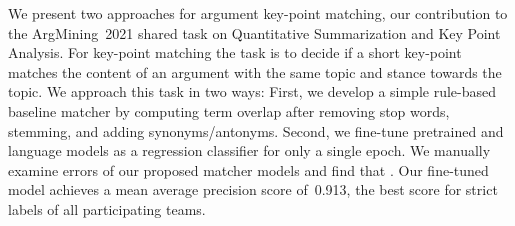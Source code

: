 We present two approaches for argument key-point matching, our contribution to the ArgMining~2021 shared task on Quantitative Summarization and Key Point Analysis.
For key-point matching the task is to decide if a short key-point matches the content of an argument with the same topic and stance towards the topic.
We approach this task in two ways:
First, we develop a simple rule-based baseline matcher by computing term overlap after removing stop words, stemming, and adding synonyms/antonyms.
Second, we fine-tune pretrained \Bert and \Roberta language models as a regression classifier for only a single epoch.
We manually examine errors of our proposed matcher models and find that .
Our fine-tuned \RobertaBase model achieves a mean average precision score of~0.913, the best score for strict labels of all participating teams.
